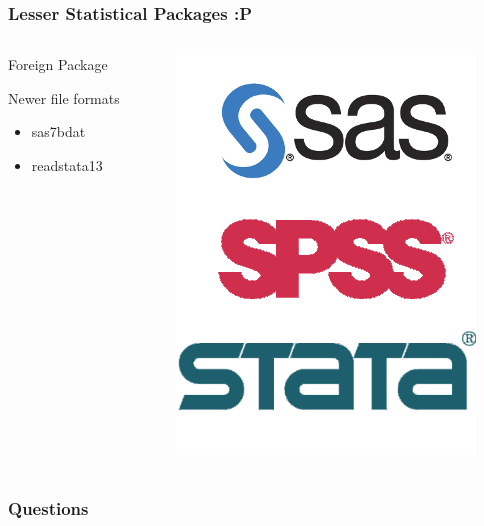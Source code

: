 \documentclass{beamer}\usepackage[]{graphicx}\usepackage[]{color}
\begin{document}
\begin{frame}
\frametitle{Lesser Statistical Packages :P}
\begin{columns}[T]
	\begin{column}{.5\textwidth}
		\vspace{1em}
		Foreign Package\vspace{1em}

		Newer file formats\vspace{1em}
		\begin{itemize}
			\item sas7bdat
			\item readstata13
		\end{itemize}
	\end{column}
	\begin{column}{.5\textwidth}
		\includegraphics[width=.8\textwidth]{./figures/lesser.png}
	\end{column}
\end{columns}


\end{frame}


\begin{frame}
	\frametitle{Questions}
	\begin{center}
		\vfill
		\vfill
	\end{center}
\end{frame}
\end{document}
